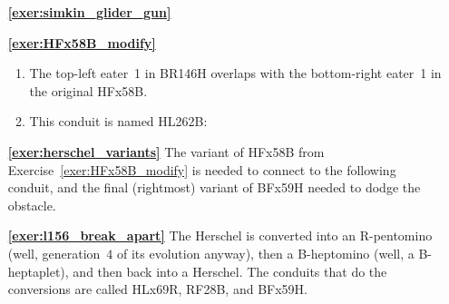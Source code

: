 \begin{multicols}{2}
\begin{itemize}[leftmargin=0em]
		
		\item[\bf\color{ocre}\sffamily\ref{exer:simkin_glider_gun}]  \\
		
		
		\item[\bf\color{ocre}\sffamily\ref{exer:HFx58B_modify}] \begin{enumerate}[leftmargin=1.5em,label=\bf\color{ocre}(\alph*)]
			\item The top-left eater~1 in BR146H overlaps with the bottom-right eater~1 in the original HFx58B.
			
			\item This conduit is named HL262B:
			\begin{center}
			\end{center}
		\end{enumerate}
		
		
		\item[\bf\color{ocre}\sffamily\ref{exer:herschel_variants}] The variant of HFx58B from Exercise~\ref{exer:HFx58B_modify} is needed to connect to the following conduit, and the final (rightmost) variant of BFx59H needed to dodge the obstacle.
		\begin{center}
		\end{center}
		
		
		\item[\bf\color{ocre}\sffamily\ref{exer:l156_break_apart}] The Herschel is converted into an R-pentomino (well, generation~$4$ of its evolution anyway), then a B-heptomino (well, a B-heptaplet), and then back into a Herschel. The conduits that do the conversions are called HLx69R, RF28B, and BFx59H.\\
		


\end{itemize}
\end{multicols}
